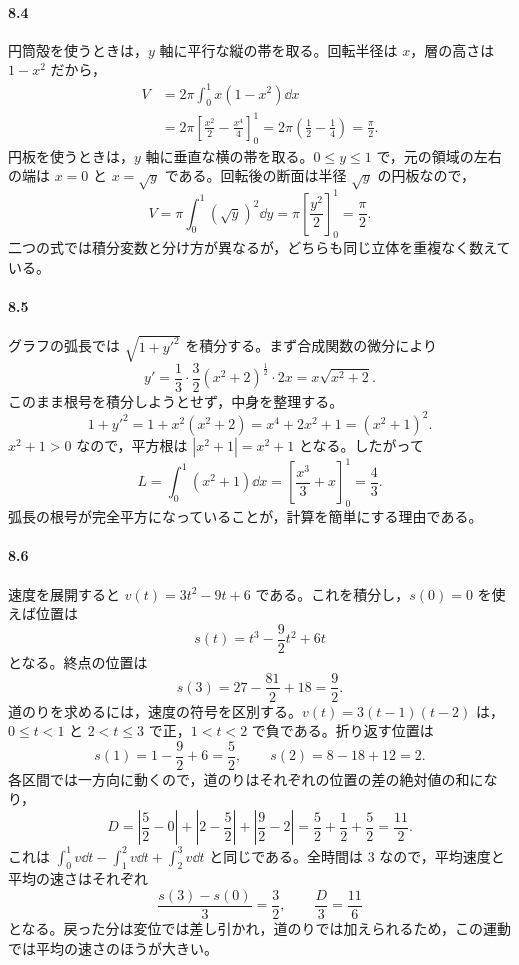 \paragraph{8.4}
円筒殻を使うときは，$y$ 軸に平行な縦の帯を取る。回転半径は $x$，層の高さは $1-x^2$ だから，
\[
\begin{aligned}
V&=2\pi\int_0^1x(1-x^2)\dd x\\
 &=2\pi\left[\frac{x^2}{2}-\frac{x^4}{4}\right]_0^1
 =2\pi\left(\frac12-\frac14\right)=\frac{\pi}{2}.
\end{aligned}
\]
円板を使うときは，$y$ 軸に垂直な横の帯を取る。$0\leq y\leq1$ で，元の領域の左右の端は $x=0$ と $x=\sqrt y$ である。回転後の断面は半径 $\sqrt y$ の円板なので，
\[
V=\pi\int_0^1(\sqrt y)^2\dd y
 =\pi\left[\frac{y^2}{2}\right]_0^1=\frac{\pi}{2}.
\]
二つの式では積分変数と分け方が異なるが，どちらも同じ立体を重複なく数えている。

\paragraph{8.5}
グラフの弧長では $\sqrt{1+y'^2}$ を積分する。まず合成関数の微分により
\[
y'=\frac13\cdot\frac32(x^2+2)^{\frac12}\cdot2x
 =x\sqrt{x^2+2}.
\]
このまま根号を積分しようとせず，中身を整理する。
\[
1+y'^2=1+x^2(x^2+2)=x^4+2x^2+1=(x^2+1)^2.
\]
$x^2+1>0$ なので，平方根は $|x^2+1|=x^2+1$ となる。したがって
\[
L=\int_0^1(x^2+1)\dd x
 =\left[\frac{x^3}{3}+x\right]_0^1=\frac43.
\]
弧長の根号が完全平方になっていることが，計算を簡単にする理由である。

\paragraph{8.6}
速度を展開すると $v(t)=3t^2-9t+6$ である。これを積分し，$s(0)=0$ を使えば位置は
\[
s(t)=t^3-\frac92t^2+6t
\]
となる。終点の位置は
\[
s(3)=27-\frac{81}{2}+18=\frac92.
\]
道のりを求めるには，速度の符号を区別する。$v(t)=3(t-1)(t-2)$ は，$0\leq t<1$ と $2<t\leq3$ で正，$1<t<2$ で負である。折り返す位置は
\[
s(1)=1-\frac92+6=\frac52,\qquad
s(2)=8-18+12=2.
\]
各区間では一方向に動くので，道のりはそれぞれの位置の差の絶対値の和になり，
\[
D=\left|\frac52-0\right|
 +\left|2-\frac52\right|
 +\left|\frac92-2\right|
 =\frac52+\frac12+\frac52=\frac{11}{2}.
\]
これは $\int_0^1v\dd t-\int_1^2v\dd t+\int_2^3v\dd t$ と同じである。全時間は $3$ なので，平均速度と平均の速さはそれぞれ
\[
\frac{s(3)-s(0)}{3}=\frac32,\qquad
\frac{D}{3}=\frac{11}{6}
\]
となる。戻った分は変位では差し引かれ，道のりでは加えられるため，この運動では平均の速さのほうが大きい。

